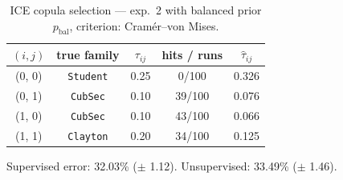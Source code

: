 \begin{table}[htbp]
  \centering
  \caption{ICE copula selection — exp.\ 2 with balanced prior $p_{\text{bal}}$, criterion: Cram\'er--von Mises.}
  \label{tab:exp3-exp2_bal_p__cvm}
  \begin{tabular}{ccccc}
    \toprule
    $(i, j)$ & true family & $\tau_{ij}$ & hits / runs & $\hat\tau_{ij}$ \\
    \midrule
    (0, 0) & \texttt{Student} & 0.25 & 0/100 & 0.326 \\
    (0, 1) & \texttt{CubSec} & 0.10 & 39/100 & 0.076 \\
    (1, 0) & \texttt{CubSec} & 0.10 & 43/100 & 0.066 \\
    (1, 1) & \texttt{Clayton} & 0.20 & 34/100 & 0.125 \\
    \bottomrule
  \end{tabular}
  \par\smallskip Supervised error: 32.03\% ($\pm$ 1.12). Unsupervised: 33.49\% ($\pm$ 1.46).
\end{table}
